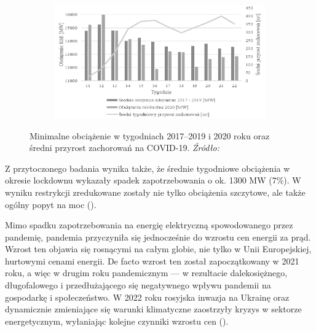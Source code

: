 \documentclass[polish, twoside, 12pt, a4paper]{article}
\theoremstyle{definition}
\theoremstyle{plain}
\theoremstyle{remark}
\begin{document}
\begin{figure}[hbt]
  \centering

  \begin{subfigure}[t]{0.45\textwidth}
    \hspace{-1.5cm}
    \includegraphics[width=1.4\textwidth]{./out_figures/figure_8}
  \end{subfigure}

  \captionsetup{margin=10pt,font=small,labelfont=bf,width=.8\textwidth}

  \caption[Minimalne obciążenie w tygodniach 2017--2019 i 2020 roku oraz średni przyrost zachorowań na COVID-19]{Minimalne obciążenie w tygodniach 2017--2019 i 2020 roku oraz średni przyrost zachorowań na COVID-19. \textit{Źródło:} \cite{stahl2021}}\label{fig:x8}
\end{figure}

Z przytoczonego badania wynika także, że średnie tygodniowe obciążenia w okresie lockdownu wykazały spadek zapotrzebowania o ok. 1300 MW (7\%). W wyniku restrykcji zredukowane zostały nie tylko obciążenia szczytowe, ale także ogólny popyt na moc (\cite{stahl2021}).

Mimo spadku zapotrzebowania na energię elektryczną spowodowanego przez pandemię, pandemia przyczyniła się jednocześnie do wzrostu cen energii za prąd. Wzrost ten objawia się rosnącymi na całym globie, nie tylko w Unii Europejskiej, hurtowymi cenami energii. De facto wzrost ten został zapoczątkowany w 2021 roku, a więc w drugim roku pandemicznym --- w rezultacie dalekosiężnego, długofalowego i przedłużającego się negatywnego wpływu pandemii na gospodarkę i społeczeństwo. W 2022 roku rosyjska inwazja na Ukrainę oraz dynamicznie zmieniające się warunki klimatyczne zaostrzyły kryzys w sektorze energetycznym, wyłaniając kolejne czynniki wzrostu cen (\cite{council2023}). 
\end{document}
